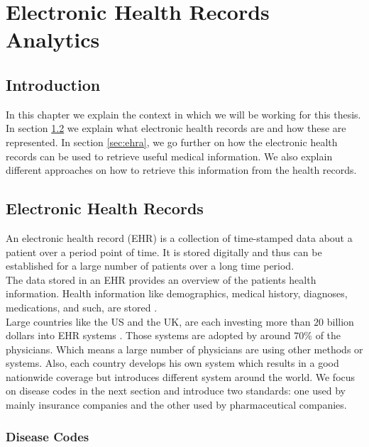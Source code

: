\graphicspath{ {Context/Images/} }


\chapter{Electronic Health Records Analytics}
\label{cha:context}

\section{Introduction}

In this chapter we explain the context in which we will be working for this thesis. \\

In section \ref{sec:ehr} we explain what electronic health records are and how these are represented. In section \ref{sec:ehra}, we go further on how the electronic health records can be used to retrieve useful medical information. We also explain different approaches on how to retrieve this information from the health records.


\section{Electronic Health Records}
\label{sec:ehr}

An electronic health record (EHR) is a collection of time-stamped data about a patient over a period point of time. It is stored digitally and thus can be established for a large number of patients over a long time period. \\
The data stored in an EHR provides an overview of the patients health information. Health information like demographics, medical history, diagnoses, medications, and such, are stored \cite{HealthIT:online}. \\

Large countries like the US and the UK, are each investing more than $20$ billion dollars into EHR systems \cite{EHRworld:article}. Those systems are adopted by around $70$\% of the physicians. Which means a large number of physicians are using other methods or systems. Also, each country develops his own system which results in a good nationwide coverage but introduces different system around the world. We focus on disease codes in the next section and introduce two standards: one used by mainly insurance companies and the other used by pharmaceutical companies.


\subsection{Disease Codes}

